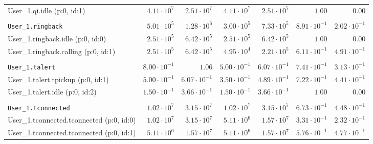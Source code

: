 \begin{table}[htbp]
{\begin{tabular}{lrrrrrr}
\hspace{3mm}User\_1.qi.idle (p:0, id:1)               &  $4.11 \cdot 10^{7}$ &  $2.51 \cdot 10^{7}$ &  $4.11 \cdot 10^{7}$ &  $2.51 \cdot 10^{7}$ &               $1.00$ &               $0.00$ \\
\\[-8pt]\texttt{User\_1.ringback}                     &  $5.01 \cdot 10^{5}$ &  $1.28 \cdot 10^{6}$ &  $3.00 \cdot 10^{5}$ &  $7.33 \cdot 10^{5}$ & $8.91 \cdot 10^{-1}$ & $2.02 \cdot 10^{-1}$ \\
\hspace{3mm}User\_1.ringback.idle (p:0, id:0)         &  $2.51 \cdot 10^{5}$ &  $6.42 \cdot 10^{5}$ &  $2.51 \cdot 10^{5}$ &  $6.42 \cdot 10^{5}$ &               $1.00$ &               $0.00$ \\
\hspace{3mm}User\_1.ringback.calling (p:0, id:1)      &  $2.51 \cdot 10^{5}$ &  $6.42 \cdot 10^{5}$ &  $4.95 \cdot 10^{4}$ &  $2.21 \cdot 10^{5}$ & $6.11 \cdot 10^{-1}$ & $4.91 \cdot 10^{-1}$ \\
\\[-8pt]\texttt{User\_1.talert}                       & $8.00 \cdot 10^{-1}$ &               $1.06$ & $5.00 \cdot 10^{-1}$ & $6.07 \cdot 10^{-1}$ & $7.41 \cdot 10^{-1}$ & $3.13 \cdot 10^{-1}$ \\
\hspace{3mm}User\_1.talert.tpickup (p:0, id:1)        & $5.00 \cdot 10^{-1}$ & $6.07 \cdot 10^{-1}$ & $3.50 \cdot 10^{-1}$ & $4.89 \cdot 10^{-1}$ & $7.22 \cdot 10^{-1}$ & $4.41 \cdot 10^{-1}$ \\
\hspace{3mm}User\_1.talert.idle (p:0, id:2)           & $1.50 \cdot 10^{-1}$ & $3.66 \cdot 10^{-1}$ & $1.50 \cdot 10^{-1}$ & $3.66 \cdot 10^{-1}$ &               $1.00$ &               $0.00$ \\
\\[-8pt]\texttt{User\_1.tconnected}                   &  $1.02 \cdot 10^{7}$ &  $3.15 \cdot 10^{7}$ &  $1.02 \cdot 10^{7}$ &  $3.15 \cdot 10^{7}$ & $6.73 \cdot 10^{-1}$ & $4.48 \cdot 10^{-1}$ \\
\hspace{3mm}User\_1.tconnected.tconnected (p:0, id:0) &  $1.02 \cdot 10^{7}$ &  $3.15 \cdot 10^{7}$ &  $5.11 \cdot 10^{6}$ &  $1.57 \cdot 10^{7}$ & $3.31 \cdot 10^{-1}$ & $2.32 \cdot 10^{-1}$ \\
\hspace{3mm}User\_1.tconnected.tconnected (p:0, id:1) &  $5.11 \cdot 10^{6}$ &  $1.57 \cdot 10^{7}$ &  $5.11 \cdot 10^{6}$ &  $1.57 \cdot 10^{7}$ & $5.76 \cdot 10^{-1}$ & $4.77 \cdot 10^{-1}$ \\

\end{tabular}}
\end{table}
